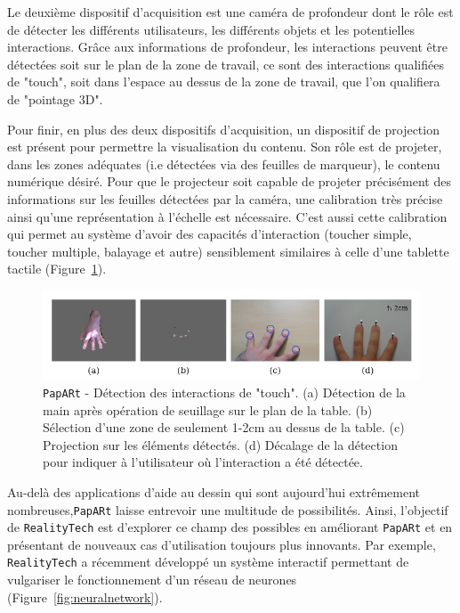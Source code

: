 Le deuxième dispositif d'acquisition est une caméra de profondeur dont le rôle est de détecter les différents utilisateurs, les différents objets et les potentielles interactions. Grâce aux informations de profondeur, les interactions peuvent être détectées soit sur le plan de la zone de travail, ce sont des interactions qualifiées de "touch", soit dans l'espace au dessus de la zone de travail, que l'on qualifiera de "pointage 3D".

Pour finir, en plus des deux dispositifs d'acquisition, un dispositif de projection est présent pour permettre la visualisation du contenu. Son rôle est de projeter, dans les zones adéquates (i.e détectées via des feuilles de marqueur), le contenu numérique désiré. Pour que le projecteur soit capable de projeter précisément des informations sur les feuilles détectées par la caméra, une calibration très précise ainsi qu'une représentation à l'échelle est nécessaire. C'est aussi cette calibration qui permet au système d'avoir des capacités d'interaction (toucher simple, toucher multiple, balayage et autre) sensiblement similaires à celle d'une tablette tactile (Figure~\ref{fig:papart:touch}).


\begin{figure}[H]
\centering
\includegraphics[width=\linewidth]{images/paparttouch}
\caption{\texttt{PapARt} - Détection des interactions de "touch". (a) Détection de la main après opération de seuillage sur le plan de la table. (b) Sélection d'une zone de seulement 1-2cm au dessus de la table. (c) Projection sur les éléments détectés. (d) Décalage de la détection pour indiquer à l'utilisateur où l'interaction a été détectée.\protect\footnotemark}
\label{fig:papart:touch}
\end{figure}


Au-delà des applications d'aide au dessin qui sont aujourd'hui extrêmement nombreuses,\texttt{PapARt} laisse entrevoir une multitude de possibilités. Ainsi, l'objectif de \texttt{RealityTech} est d'explorer ce champ des possibles en améliorant \texttt{PapARt} et en présentant de nouveaux cas d'utilisation toujours plus innovants. Par exemple, \texttt{RealityTech} a récemment développé un système interactif permettant de vulgariser le fonctionnement d'un réseau de neurones (Figure~\ref{fig:neuralnetwork}).

